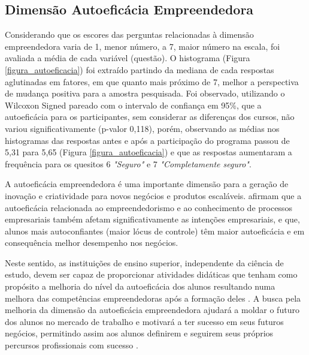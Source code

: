 



\subsection{Dimensão Autoeficácia Empreendedora}

Considerando que os escores das perguntas relacionadas à dimensão empreendedora varia de 1, menor número, a 7, maior número na escala, foi avaliada a média de cada variável (questão). O histograma (Figura \ref{figura_autoeficacia}) foi extraído partindo da mediana de cada respostas aglutinadas em fatores, em que quanto mais próximo de 7, melhor a perspectiva de mudança positiva para a amostra pesquisada. Foi observado, utilizando o Wilcoxon Signed pareado com o intervalo de confiança em 95\%, que a autoeficácia para os participantes, sem considerar as diferenças dos cursos, não variou significativamente (p-valor 0,118), porém, observando as médias nos histogramas das respostas antes e após a participação do programa passou de 5,31 para 5,65 (Figura \ref{figura_autoeficacia}) e que as respostas aumentaram a frequência para os quesitos 6 \textit{"Seguro"} e 7 \textit{"Completamente seguro"}.

A autoeficácia empreendedora é uma importante dimensão para a geração de inovação e criatividade para novos negócios e produtos escaláveis.  afirmam que a autoeficácia relacionada ao empreendedorismo e ao conhecimento de processos empresariais também afetam significativamente as intenções empresariais, e que, alunos mais autoconfiantes (maior lócus de controle) têm maior autoeficácia e em consequência melhor desempenho nos negócios.

Neste sentido, as instituições de ensino superior, independente da ciência de estudo, devem ser capaz de proporcionar atividades didáticas que tenham como propósito a melhoria do nível da autoeficácia dos alunos resultando numa melhora das competências empreendedoras após a formação deles \cite{ribeiro_autoeficacia_2019}. A busca pela melhoria da dimensão da autoeficácia empreendedora ajudará a moldar o futuro dos alunos no mercado de trabalho e motivará a ter sucesso em seus futuros negócios, permitindo assim aos alunos definirem e seguirem seus próprios percursos profissionais com sucesso \cite{das_examining_2018}.

